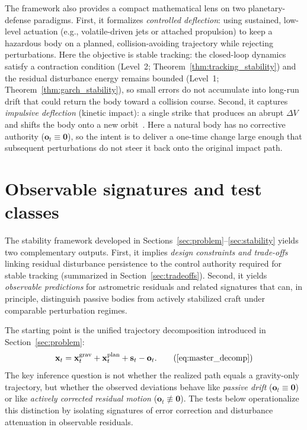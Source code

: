 \documentclass{article}
\begin{document}
The framework also provides a compact mathematical lens on two planetary-defense paradigms. First, it formalizes \emph{controlled deflection}: using sustained, low-level actuation (e.g., volatile-driven jets or attached propulsion) to keep a hazardous body on a planned, collision-avoiding trajectory while rejecting perturbations. Here the objective is stable tracking: the closed-loop dynamics satisfy a contraction condition (Level~2; Theorem~\ref{thm:tracking_stability}) and the residual disturbance energy remains bounded (Level~1; Theorem~\ref{thm:garch_stability}), so small errors do not accumulate into long-run drift that could return the body toward a collision course. Second, it captures \emph{impulsive deflection} (kinetic impact): a single strike that produces an abrupt $\Delta V$ and shifts the body onto a new orbit~\cite{daly2023dart,thomas2023dart,vasile2008asteroid_deflection,sanchez2009multicriteria_neo}. Here a natural body has no corrective authority ($\mathbf{o}_t\equiv\mathbf{0}$), so the intent is to deliver a one-time change large enough that subsequent perturbations do not steer it back onto the original impact path.


\section{Observable signatures and test classes}
\label{sec:results}

The stability framework developed in Sections~\ref{sec:problem}--\ref{sec:stability} yields two complementary outputs. First, it implies \emph{design constraints and trade-offs} linking residual disturbance persistence to the control authority required for stable tracking (summarized in Section~\ref{sec:tradeoffs}). Second, it yields \emph{observable predictions} for astrometric residuals and related signatures that can, in principle, distinguish passive bodies from actively stabilized craft under comparable perturbation regimes.

The starting point is the unified trajectory decomposition introduced in Section~\ref{sec:problem}:
\begin{equation}
\mathbf{x}_t
=
\mathbf{x}^{\mathrm{grav}}_t
+
\mathbf{x}^{\mathrm{plan}}_t
+
\mathbf{s}_t
-
\mathbf{o}_t .
\tag{\ref{eq:master_decomp}}
\end{equation}
The key inference question is not whether the realized path equals a gravity-only trajectory, but whether the observed deviations behave like \emph{passive drift} ($\mathbf{o}_t\equiv \mathbf{0}$) or like \emph{actively corrected residual motion} ($\mathbf{o}_t\not\equiv \mathbf{0}$). The tests below operationalize this distinction by isolating signatures of error correction and disturbance attenuation in observable residuals.
\end{document}

